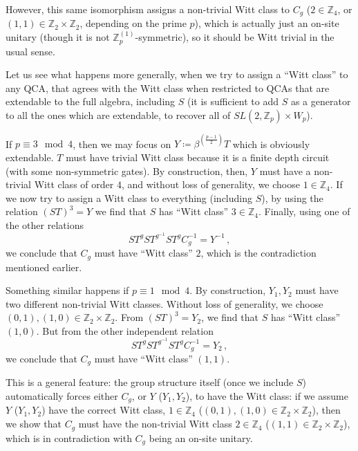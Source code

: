 \documentclass[aps,twocolumn,prx,floatfix,preprintnumbers, nofootinbib,10pt]{revtex4-2}
\numberwithin{equation}{section}
\theoremstyle{definition}
\theoremstyle{remark}
\theoremstyle{claim}
\newcommand{\be}{\begin{equation}}
\newcommand{\ee}{\end{equation}}
\newcommand{\Z}{{\mathbb Z}}
\begin{document}
However, this same isomorphism assigns a non-trivial Witt class to $C_g$ ($2 \in \Z_4$, or $(1, 1) \in \Z_2 \times \Z_2$, depending on the prime $p$), which is actually just an on-site unitary (though it is not $\Z_p^{(1)}$-symmetric), so it should be Witt trivial {in the usual sense}.

Let us see what happens more generally, when we try to assign a  ``Witt class'' to any QCA, that agrees with the Witt class when restricted to QCAs that are extendable to the full algebra, including $S$ (it is sufficient to add $S$ as a generator to all the ones which are extendable, to recover all of $SL(2, \Z_p) \times W_p$).

If $p \equiv 3 \mod 4$, then we may focus on $Y \coloneqq \beta^{(\frac{p-1}{2})} T$ which is obviously extendable. $T$ must have trivial Witt class because it is a finite depth circuit (with some non-symmetric gates). By construction, then, $Y$ must have a non-trivial Witt class of order $4$, and without loss of generality, we choose $1 \in \Z_4$. If we now try to assign a Witt class to everything (including $S$), by using the relation $(ST)^3 = Y$ we find that $S$ has ``Witt class'' $3 \in \Z_4$. Finally, using one of the other relations
\be\label{eq:g_odd_relation_3mod4}
S T^g S T^{g^{-1}} S T^g C_g^{-1} = Y^{-1} \,,
\ee
we conclude that $C_g$ must have ``Witt class'' $2$, which is the contradiction mentioned earlier.

Something similar happens if $p \equiv 1 \mod 4$. By construction, $Y_1, Y_2$ must have two different non-trivial Witt classes. Without loss of generality, we choose $(0, 1), (1, 0) \in \Z_2 \times \Z_2$. From $(ST)^3 = Y_2$, we find that $S$ has ``Witt class'' $(1, 0)$. But from the other independent relation
\be\label{eq:g_odd_relation_1mod4}
S T^g S T^{g^{-1}} S T^g C_g^{-1} = Y_2 \,,
\ee
we conclude that $C_g$ must have ``Witt class'' $(1, 1)$.

This is a general feature: the group structure itself (once we include $S$) automatically forces either $C_g$, or $Y$ ($Y_1, Y_2$), to have the  Witt class: if we assume $Y$ ($Y_1, Y_2$) have the correct Witt class, $1 \in \Z_4$ ($(0, 1), (1, 0) \in \Z_2 \times \Z_2$), then we show that $C_g$ must have the non-trivial Witt class $2 \in \Z_4$ ($(1, 1) \in \Z_2 \times \Z_2$), which is in contradiction with $C_g$ being an on-site unitary.  
\end{document}

